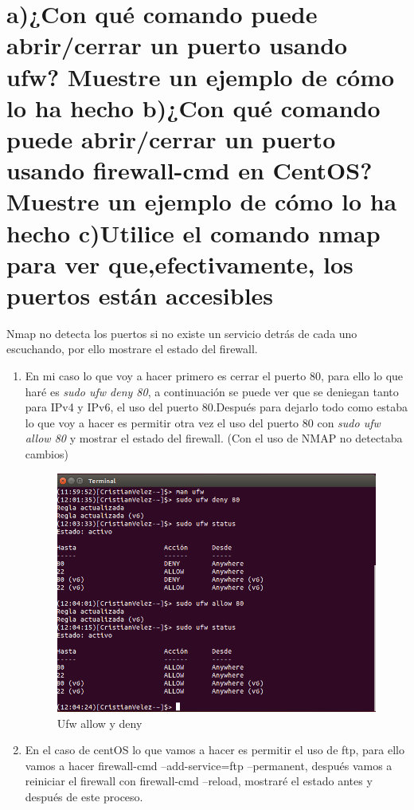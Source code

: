 \section[Cuestión 3]{a)¿Con qué comando puede abrir/cerrar un puerto usando ufw? Muestre un ejemplo de cómo lo ha hecho	b)¿Con qué comando puede abrir/cerrar un puerto usando firewall-cmd en CentOS? Muestre un ejemplo de cómo lo ha hecho c)Utilice el comando nmap para ver que,efectivamente, los puertos están accesibles}

Nmap no detecta los puertos si no existe un servicio detrás de cada uno escuchando, por ello mostrare el estado del firewall.

\begin{enumerate}[label=(\alph*)]
	\item En mi caso lo que voy a hacer primero es cerrar el puerto 80, para ello lo que haré es \textit{sudo ufw deny 80}, a continuación se puede ver que se deniegan tanto para IPv4 y IPv6, el uso del puerto 80.Después para dejarlo todo como estaba lo que voy a hacer es permitir otra vez el uso del puerto 80 con \textit{sudo ufw allow 80} y mostrar el estado del firewall.
	(Con el uso de NMAP no detectaba cambios)
	
		\begin{figure}[H]
		\centering
		\includegraphics[scale=0.5]{pics/1_ufw.png}  
		\caption{Ufw allow y deny} \label{fig:figura11}
	\end{figure}

	\item En el caso de centOS lo que vamos a hacer es permitir el uso de ftp, para ello vamos a hacer firewall-cmd --add-service=ftp --permanent, después vamos a reiniciar el firewall con firewall-cmd --reload, mostraré el estado antes y después de este proceso.
	

\end{enumerate}

